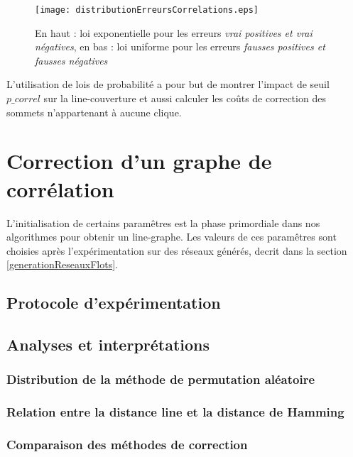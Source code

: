 \documentclass[onecolumn, 12pt]{book}
\begin{document}
\begin{figure}[htb!] 
\centering
\texttt{[image: distributionErreursCorrelations.eps]}
\caption{En haut : loi exponentielle pour les erreurs   {\em vrai positives et vrai n\'egatives}, en bas : loi uniforme pour les erreurs   {\em fausses positives et fausses n\'egatives} }
\label{distributionErreursCorrelations} 
\end{figure}

 
L'utilisation de lois de probabilit\'e a pour but de montrer l'impact de seuil $p\_correl$ sur la line-couverture et aussi calculer les co\^uts de correction des sommets n'appartenant \`a aucune clique.

\section{Correction d'un graphe de corr\'elation}
L'initialisation de certains param\^etres est la phase primordiale dans nos algorithmes pour obtenir un line-graphe. Les valeurs de ces param\^etres sont choisies apr\`es l'exp\'erimentation sur des r\'eseaux g\'en\'er\'es, decrit dans la section \ref{generationReseauxFlots}.

\subsection{Protocole d'exp\'erimentation}

\subsection{Analyses et interpr\'etations}

\subsubsection{Distribution de la m\'ethode de permutation al\'eatoire}

\subsubsection{Relation entre la distance line et la distance de Hamming}

\subsubsection{Comparaison des m\'ethodes de correction}

\end{document}
